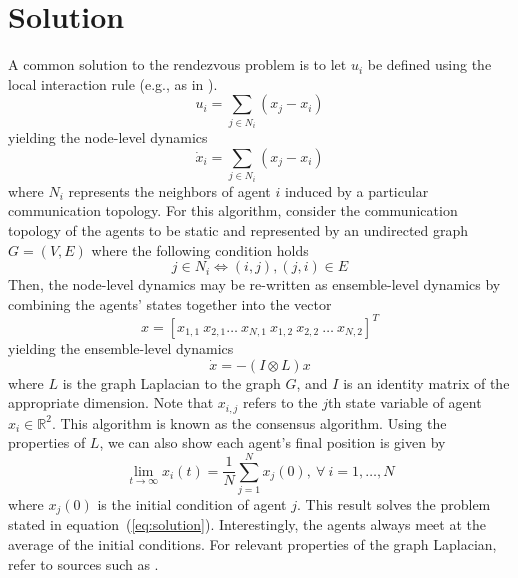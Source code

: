 \documentclass{article}
\begin{document}
\section{Solution}
A common solution to the rendezvous problem is to let $u_{i}$ be defined using the local interaction rule (e.g., as in \cite{jadbabaie}).
\[
u_{i} = \sum_{j \in N_{i}} (x_{j} - x_{i})
\]
yielding the node-level dynamics
\begin{equation}
    \dot{x}_{i} = \sum_{j \in N_{i}} (x_{j} - x_{i})
    \label{eq:node-level-dynamics}
\end{equation}
where $N_{i}$ represents the neighbors of agent $i$ induced by a particular communication topology.  For this algorithm, consider the communication topology of the agents to be static and represented by an undirected graph $G = (V, E)$ where the following condition holds 
\[
j \in N_{i} \iff (i, j), (j, i) \in E
\]
Then, the node-level dynamics may be re-written as ensemble-level dynamics by combining the agents' states together into the vector
\[
x = \left[ x_{1,1} ~ x_{2,1} \hdots ~ x_{N,1} ~ x_{1, 2} ~ x_{2, 2} ~ \hdots ~ x_{N, 2} \right]^{T}
\]
yielding the ensemble-level dynamics 
\[
\dot{x} = -(I \otimes L)x
\]
where $L$ is the graph Laplacian to the graph $G$, and $I$ is an identity matrix of the appropriate dimension.  Note that $x_{i, j}$ refers to the $j$th state variable of agent $x_{i} \in \mathds{R}^{2}$.  This algorithm is known as the consensus algorithm.  Using the properties of $L$, we can also show each agent's final position is given by
\[
\lim_{t \to \infty} x_{i}(t) = \dfrac{1}{N} \sum_{j=1}^{N} x_{j}(0), ~ \forall ~ i = 1,\hdots,N
\]
where $x_{j}(0)$ is the initial condition of agent $j$.  This result solves the problem stated in equation~(\ref{eq:solution}).  Interestingly, the agents always meet at the average of the initial conditions.  For relevant properties of the graph Laplacian, refer to sources such as \cite{godsil}.  


\end{document}
